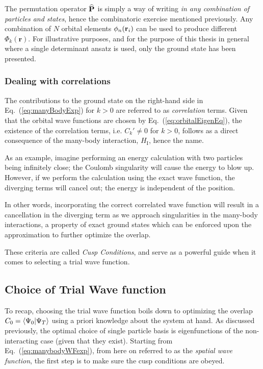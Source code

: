 The permutation operator ${\bf\widehat{P}}$ is simply a way of writing \textit{in any combination of particles and states}, hence the combinatoric exercise mentioned previously. Any combination of $N$ orbital elements $\phi_n(\mathbf{r}_i)$ can be used to produce different $\Phi_k(\mathbf{r})$. For illustrative purposes, and for the purpose of this thesis in general where a single determinant ansatz is used, only the ground state has been presented.  

\subsubsection{Dealing with correlations}

The contributions to the ground state on the right-hand side in Eq.~(\ref{eq:manyBodyExp}) for $k>0$ are referred to as \textit{correlation} terms. Given that the orbital wave functions are chosen by Eq.~(\ref{eq:orbitalEigenEq}), the existence of the correlation terms, i.e. $C_k' \ne 0$ for $k>0$, follows as a direct consequence of the many-body interaction, $H_\mathrm{I}$, hence the name.

As an example, imagine performing an energy calculation with two particles being infinitely close; the Coulomb singularity will cause the energy to blow up. However, if we perform the calculation using the exact wave function, the diverging terms will cancel out; the energy is independent of the position. 

In other words, incorporating the correct correlated wave function will result in a cancellation in the diverging term as we approach singularities in the many-body interactions, a property of exact ground states which can be enforced upon the approximation to further optimize the overlap. 

These criteria are called \textit{Cusp Conditions}, and serve as a powerful guide when it comes to selecting a trial wave function. 





\subsection{Choice of Trial Wave function}
\label{sec:ChoiceTrialWF}

To recap, choosing the trial wave function boils down to optimizing the overlap $C_0 = \left\langle \Psi_0 | \Psi_T\right\rangle$ using a priori knowledge about the system at hand. As discussed previously, the optimal choice of single particle basis is eigenfunctions of the non-interacting case (given that they exist). Starting from Eq.~(\ref{eq:manybodyWFexp}), from here on referred to as the \textit{spatial wave function}, the first step is to make sure the cusp conditions are obeyed.

